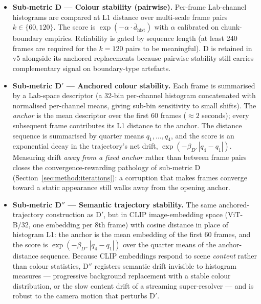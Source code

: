 \begin{itemize}
    \item \textbf{Sub-metric D --- Colour stability (pairwise).} Per-frame Lab-channel
          histograms are compared at L1 distance over multi-scale frame pairs
          $k \in \{60, 120\}$. The score is $\exp(-\alpha \cdot
          \overline{d}_{\mathrm{hist}})$ with $\alpha$ calibrated on chunk-boundary
          empirics. Reliability is gated by sequence length (at least 240 frames are
          required for the $k{=}120$ pairs to be meaningful). D is retained in v5
          alongside its anchored replacements because pairwise stability still
          carries complementary signal on boundary-type artefacts.

    \item \textbf{Sub-metric D$'$ --- Anchored colour stability.} Each frame is
          summarised by a Lab-space descriptor (a 32-bin per-channel histogram
          concatenated with normalised per-channel means, giving sub-bin sensitivity
          to small shifts). The \emph{anchor} is the mean descriptor over the first
          60 frames ($\approx 2$ seconds); every subsequent frame contributes its L1
          distance to the anchor. The distance sequence is summarised by quarter
          means $q_1, \dots, q_4$, and the score is an exponential decay in the
          trajectory's net drift, $\exp(-\beta_{D'} \, |q_4 - q_1|)$. Measuring drift
          \emph{away from a fixed anchor} rather than between frame pairs closes the
          convergence-rewarding pathology of sub-metric D
          (Section~\ref{sec:method:iterations}): a corruption that makes frames
          converge toward a static appearance still walks away from the opening
          anchor.

    \item \textbf{Sub-metric D$''$ --- Semantic trajectory stability.} The same
          anchored-trajectory construction as D$'$, but in CLIP
          \cite{radford_learning_2021} image-embedding space (ViT-B/32, one embedding
          per 8th frame) with cosine distance in place of histogram L1: the anchor is
          the mean embedding of the first 60 frames, and the score is
          $\exp(-\beta_{D''} \, |q_4 - q_1|)$ over the quarter means of the
          anchor-distance sequence. Because CLIP embeddings respond to scene
          \emph{content} rather than colour statistics, D$''$ registers semantic
          drift invisible to histogram measures --- progressive background
          replacement with a stable colour distribution, or the slow content drift
          of a streaming super-resolver --- and is robust to the camera motion that
          perturbs D$'$.


\end{itemize}
